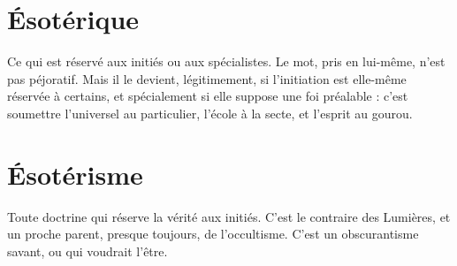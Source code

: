 \section{Ésotérique}
Ce qui est réservé aux initiés ou aux spécialistes. Le mot,
pris en lui-même, n’est pas péjoratif. Mais il le devient, légitimement,
si l'initiation est elle-même réservée à certains, et spécialement si elle
suppose une foi préalable : c’est soumettre l’universel au particulier, l’école à la
secte, et l'esprit au gourou.

\section{Ésotérisme}
Toute doctrine qui réserve la vérité aux initiés. C’est le
contraire des Lumières, et un proche parent, presque toujours,
de l’occultisme. C’est un obscurantisme savant, ou qui voudrait l’être.

